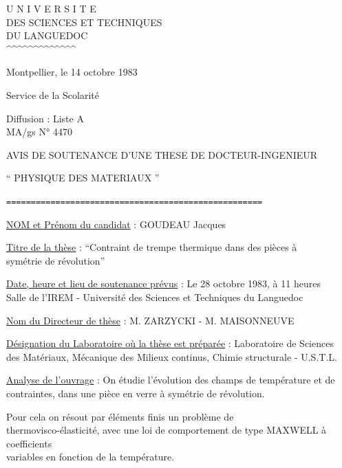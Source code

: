 
\noindent\begin{minipage}[t]{0.43\textwidth}
\centering
U N I V E R S I T E\\
DES SCIENCES ET TECHNIQUES\\
DU LANGUEDOC\\
\textasciicircum\textasciicircum\textasciicircum\textasciicircum\textasciicircum\textasciicircum\textasciicircum\textasciicircum\textasciicircum\textasciicircum\textasciicircum\textasciicircum\textasciicircum
\end{minipage}\hfill
\begin{minipage}[t]{0.49\textwidth}
\raggedleft
\vspace{\baselineskip}
Montpellier, le 14 octobre 1983
\end{minipage}

Service de la Scolarité

Diffusion : Liste A\\
MA/gs \qquad N° 4470

\begin{center}
AVIS DE SOUTENANCE D'UNE THESE DE DOCTEUR-INGENIEUR

`` PHYSIQUE \quad DES MATERIAUX ''

\texttt{====================================================}
\end{center}

\uline{NOM et Prénom du candidat} : GOUDEAU Jacques

\uline{Titre de la thèse} : ``Contraint de trempe thermique dans des pièces à\\
symétrie de révolution''

\uline{Date, heure et lieu de soutenance prévus} : Le 28 octobre 1983, à 11 heures\\
Salle de l'IREM - Université des Sciences et Techniques du Languedoc

\uline{Nom du Directeur de thèse} : M. ZARZYCKI - M. MAISONNEUVE

\uline{Désignation du Laboratoire où la thèse est préparée} : Laboratoire de Sciences\\
des Matériaux, Mécanique des Milieux continus, Chimie structurale - U.S.T.L.

\uline{Analyse de l'ouvrage} : On étudie l'évolution des champs de température et de\\
contraintes, dans une pièce en verre à symétrie de révolution.

Pour cela on résout par éléments finis un problème de\\
thermovisco-élasticité, avec une loi de comportement de type MAXWELL à coefficients\\
variables en fonction de la température.

